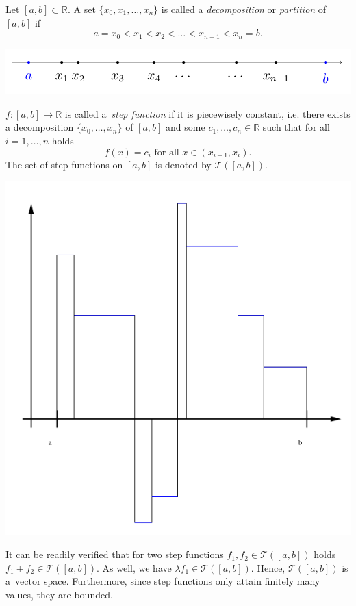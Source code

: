 

\begin{Definition}{}
Let $[a,b]\subset\mathbb{R}$. A set $\{x_{0},x_{1},\ldots,x_{n}\}$ is called a \emph{decomposition} or \emph{partition} of $[a,b]$ if
$$a=x_0<x_1<x_2<\ldots<x_{n-1}<x_n=b.$$
\end{Definition}

\includegraphics{./deco.png}

\begin{Definition}
$f:[a,b]\to\mathbb{R}$ is called a~\emph{step function} if it is piecewisely constant, i.e. there exists a decomposition $\{x_{0},\ldots,x_{n}\}$ of $[a,b]$ and some $c_1,\ldots,c_n\in\mathbb{R}$ such that for all $i=1,\ldots,n$ holds
\[f(x)=c_i\text{ for all }x\in(x_{i-1},x_i).\]
The set of step functions on $[a,b]$ is denoted by $\mathcal{T}([a,b])$.
\end{Definition}

\includegraphics{./step.png}

It can be readily verified that for two step functions $f_1,f_2\in \mathcal{T}([a,b])$ holds
$f_1+f_2\in \mathcal{T}([a,b])$. As well, we have $\lambda f_1\in \mathcal{T}([a,b])$.  Hence, $\mathcal{T}([a,b])$ is a~vector space. Furthermore, since step functions only attain finitely many values, they are bounded.


